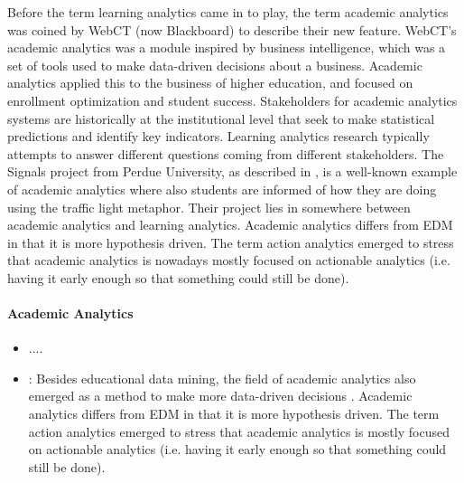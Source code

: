 \documentclass[11pt]{article}
\begin{document}
Before the term learning analytics came in to play, the term academic analytics was coined by WebCT (now Blackboard) to describe their new feature. WebCT's academic analytics was a module inspired by business intelligence, which was a set of tools used to make data-driven decisions about a business. Academic analytics applied this to the business of higher education, and focused on enrollment optimization and student success. Stakeholders for academic analytics systems are historically at the institutional level that seek to make statistical predictions and identify key indicators. Learning analytics research typically attempts to answer different questions coming from different stakeholders. The Signals project from Perdue University, as described in \cite{Arnold2010}, is a well-known example of academic analytics where also students are informed of how they are doing using the traffic light metaphor. Their project lies in somewhere between academic analytics and learning analytics. Academic analytics 
differs from EDM in that it is more hypothesis driven. The term action analytics emerged to stress that academic analytics is nowadays mostly focused on actionable analytics (i.e. having it early enough so that something could still be done).

\paragraph{Academic Analytics}
\begin{itemize}
  \item \cite{Campbell2007} ....
  \item \cite{Baepler2010}: Besides educational data mining, the field of academic analytics also emerged as a method to make more data-driven decisions . Academic analytics differs from EDM in that it is more hypothesis driven. The term action analytics emerged to stress that academic analytics is mostly focused on actionable analytics (i.e. having it early enough so that something could still be done).
\end{itemize}
\end{document}
